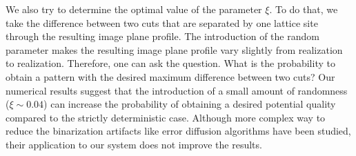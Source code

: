 We also try to determine the optimal value of the parameter $\xi$. To do that, we take the difference between two cuts that are separated by one lattice site through the resulting image plane profile. The introduction of the random parameter makes the resulting image plane profile vary slightly from realization to realization. Therefore, one can ask the question. What is the probability to obtain a pattern with the desired maximum difference between two cuts? Our numerical results suggest that the introduction of a small amount of randomness ($\xi \sim 0.04$) can increase the probability of obtaining a desired potential quality compared to the strictly deterministic case. Although more complex way to reduce the binarization artifacts like error diffusion algorithms \cite{Floyd1976, Hu2018} have been studied, their application to our system does not improve the results. 


